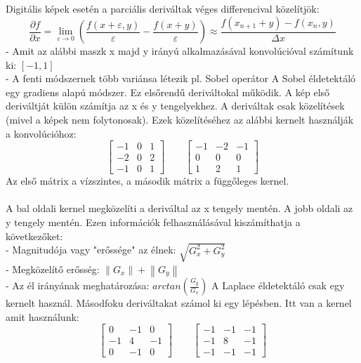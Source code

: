Digitális képek esetén a parciális deriváltak véges differencival közelítjök:
$$ \frac{\partial f}{\partial x}=\lim_{\varepsilon \to 0} \left(\frac{f(x+\varepsilon,y)}{\varepsilon}-\frac{f(x+y)}{\varepsilon}\right)\approx \frac{f(x_{n+1}+y)-f(x_n,y)}{\Delta x}$$
\indent - Amit az alábbi maszk x majd y irányú alkalmazásával konvolúcióval számítunk ki: $[-1,1]$\\
\indent - A fenti módszernek több variánsa létezik pl. Sobel operátor
A Sobel éldetektáló egy gradiens alapú módszer. Ez elsőrendű deriváltokal működik. A kép első deriváltját külön számítja az x és y tengelyekhez. A deriváltak csak közelítések (mivel a képek nem folytonosak). Ezek közelítéséhez az alábbi kernelt használják a konvolúcióhoz:
$$\begin{bmatrix}
 -1&0  &1 \\ 
-2&0  &2 \\ 
-1&0  &1 
\end{bmatrix} 
\qquad
\begin{bmatrix}
-1&-2  &-1 \\ 
0&0  &0 \\ 
1&2  &1 
\end{bmatrix}
$$
Az első mátrix a vízszintes, a második mátrix a függőleges kernel.\\ 
\\
A bal oldali kernel megközelíti a deriváltal az x tengely mentén. A jobb oldali az y tengely mentén. Ezen információk felhasználásával kiszámíthatja a következőket:\\
\indent - Magnitudója vagy "erőssége" az élnek: $\sqrt{G_{x}^{2}+G_{y}^{2}}$ \\
\indent - Megközelítő erősség: $ \left\| G_x \right \| + \left\| G_y \right \|$\\
\indent - Az él irányának meghatározása: $arctan(\frac{G_y}{G_x})$
A Laplace éldetektáló csak egy kernelt használ. Másodfoku deriváltakat számol ki egy lépésben. Itt van a kernel amit használunk:
$$\begin{bmatrix}
 0&-1  &0 \\ 
-1&4  &-1 \\ 
 0&-1  &0 
\end{bmatrix} 
\qquad
\begin{bmatrix}
-1&-1  &-1 \\ 
-1&8  &-1 \\ 
-1&-1  &-1 
\end{bmatrix}
$$
